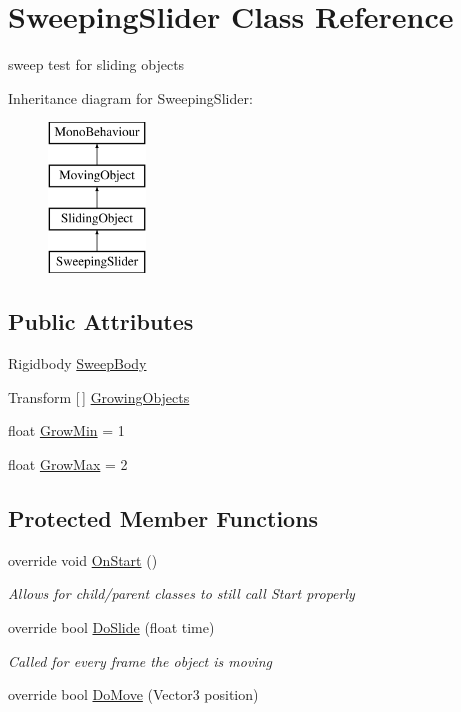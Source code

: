 \hypertarget{class_sweeping_slider}{}\section{Sweeping\+Slider Class Reference}
\label{class_sweeping_slider}


sweep test for sliding objects  


Inheritance diagram for Sweeping\+Slider\+:\begin{figure}[H]
\begin{center}
\leavevmode
\includegraphics[height=4.000000cm]{class_sweeping_slider}
\end{center}
\end{figure}
\subsection*{Public Attributes}
\begin{DoxyCompactItemize}
\item 
Rigidbody \mbox{\hyperlink{class_sweeping_slider_a96e08844d4d167c5e434b730ab078ea0}{Sweep\+Body}}
\item 
Transform \mbox{[}$\,$\mbox{]} \mbox{\hyperlink{class_sweeping_slider_a4c909987850cc1ca277166a961c8f544}{Growing\+Objects}}
\item 
float \mbox{\hyperlink{class_sweeping_slider_a6652f5431d5b04c25135bd9ddec8fd3c}{Grow\+Min}} = 1
\item 
float \mbox{\hyperlink{class_sweeping_slider_a54a4f66dd3e0e8f40e2a63965017acce}{Grow\+Max}} = 2
\end{DoxyCompactItemize}
\subsection*{Protected Member Functions}
\begin{DoxyCompactItemize}
\item 
override void \mbox{\hyperlink{class_sweeping_slider_a333d1088bd5ef48fe770e43527f75c49}{On\+Start}} ()
\begin{DoxyCompactList}\small\item\em Allows for child/parent classes to still call Start properly \end{DoxyCompactList}\item 
override bool \mbox{\hyperlink{class_sweeping_slider_ac2a74d4cc8483404f577f51aef02589e}{Do\+Slide}} (float time)
\begin{DoxyCompactList}\small\item\em Called for every frame the object is moving \end{DoxyCompactList}\item 
override bool \mbox{\hyperlink{class_sweeping_slider_aded891966e0230cae066605d1d5aaf78}{Do\+Move}} (Vector3 position)
\end{DoxyCompactItemize}
